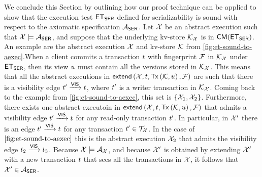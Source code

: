 
We conclude this Section by outlining how our proof technique can be applied to show that the 
execution test $\mathsf{ET}_{\mathsf{SER}}$ defined for serializability is sound with respect to the axiomatic 
specification $\mathcal{A}_{\mathsf{SER}}$. Let $\mathcal{X}$ be an abstract execution such that $\mathcal{X} \models \mathcal{A}_{\mathsf{SER}}$, and suppose that the underlying 
kv-store $\mathcal{K}_{\mathcal{X}}$ is in $\CMs(\ET_{\SER})$. An example are the abstract execution $\mathcal{X}$ 
and kv-store $\mathcal{K}$ from \cref{fig:et-sound-to-aexec}.When a client commits a transaction $t$ 
with fingerprint $\mathcal{F}$ in $\mathcal{K}_{\mathcal{X}}$ under $\mathsf{ET}_{\mathsf{SER}}$, then its view $u$ must contain all the versions stored in $\mathcal{K}_{\mathcal{X}}$. This means 
that all the abstract executions in $\extend[\aexec, \txid, \Tx[\hh, \vi], \fp]$ are such that there is a visibility 
edge $t' \xrightarrow{\mathsf{VIS}} t$, where $t'$ is a writer transaction in $\mathcal{K}_{\mathcal{X}}$. 
Coming back to the example from \cref{fig:et-sound-to-aexec}, this set is $\{\mathcal{X}_1, \mathcal{X}_2\}$.
Furthermore, 
there exists one abstract executoin in $\extend[\aexec, \txid, \Tx[\hh, \vi], \fp]$ that admits  
a visibility edge $t' \xrightarrow{\mathsf{VIS}} t$ for any read-only transaction $t'$. In particular, 
in $\mathcal{X}'$ there is an edge $t' \xrightarrow{\mathsf{VIS}} t$ for any transaction $t' \in \mathcal{T}_{\mathcal{X}}$. In the case 
of $\cref{fig:et-sound-to-aexec}$ this is the abstract execution $\mathcal{X}_2$ that admits 
the visibility edge $t_{2} \xrightarrow{\mathsf{VIS}} t_{3}$. Because $\mathcal{X} \models \mathcal{A}_{\mathcal{X}}$, and because 
$\mathcal{X}'$ is obtained by extending $\mathcal{X}'$ with a new transaction $t$ that sees all the transactions 
in $\mathcal{X}$, it follows that $\mathcal{X}' \in \mathcal{A}_{\mathsf{SER}}$.

